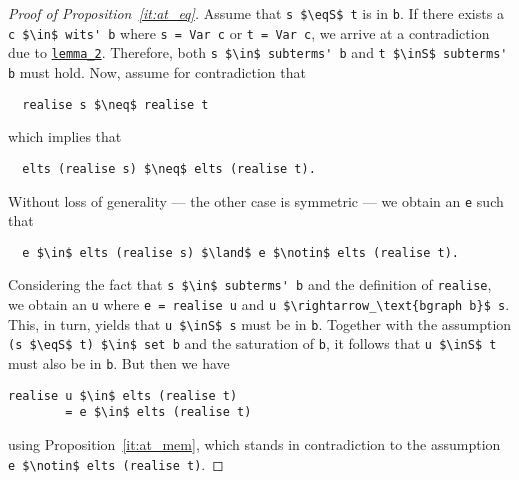 \documentclass[sigplan,10pt,anonymous,review]{acmart}
\newcommand{\inS}{\in_\text{s}}
\newcommand{\eqS}{=_\text{s}}
\begin{document}
\begin{proof}[Proof of Proposition~\ref{it:at_eq}]
  Assume that \lstinline!s $\eqS$ t! is in \lstinline!b!.
  If there exists a \lstinline!c $\in$ wits' b! where \lstinline!s = Var c! or \lstinline!t = Var c!, we arrive at a contradiction due to \hyperref[lst:lemma_2]{\lstinline!lemma_2!}.
  Therefore, both \lstinline!s $\in$ subterms' b! and \lstinline!t $\inS$ subterms' b! must hold.
  Now, assume for contradiction that
\begin{lstlisting}
  realise s $\neq$ realise t
\end{lstlisting}
  which implies that
\begin{lstlisting}
  elts (realise s) $\neq$ elts (realise t).
\end{lstlisting}
  Without loss of generality --- the other case is symmetric --- we obtain an \lstinline!e! such that
\begin{lstlisting}
  e $\in$ elts (realise s) $\land$ e $\notin$ elts (realise t). 
\end{lstlisting}
  Considering the fact that \lstinline!s $\in$ subterms' b! and the definition of \lstinline!realise!, we obtain an \lstinline!u! where \lstinline!e = realise u! and \lstinline!u $\rightarrow_\text{bgraph b}$ s!.
  This, in turn, yields that \lstinline!u $\inS$ s! must be in \lstinline!b!.
  Together with the assumption \lstinline!(s $\eqS$ t) $\in$ set b! and the saturation of \lstinline!b!, it follows that \lstinline!u $\inS$ t! must also be in \lstinline!b!.
  But then we have
\begin{lstlisting}[columns=fixed]
  realise u $\in$ elts (realise t)
        = e $\in$ elts (realise t)
\end{lstlisting}
  using Proposition~\ref{it:at_mem}, which stands in contradiction to the assumption \lstinline!e $\notin$ elts (realise t)!.
\end{proof}
\end{document}
